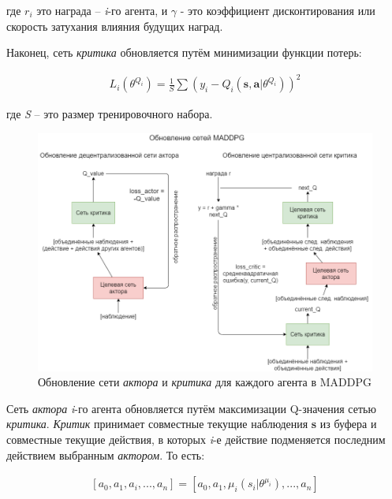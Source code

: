 где $r_i$ это награда – \textit{i}-го агента, и $\gamma$ - это коэффициент дисконтирования или скорость затухания влияния будущих наград.

Наконец, сеть \textit{критика} обновляется путём минимизации функции потерь:

\begin{equation}
    \begin{multlined}
        L_i(\theta^{Q_i}) = \frac{1}{S} \sum (y_i - Q_i(\mathbf{s, a}|\theta^{Q_i}))^2
    \end{multlined}
\end{equation}

где \textit{S} -- это размер тренировочного набора.

\begin{figure}[ht!]
    \center
    \includegraphics [scale=0.5] {my_folder/images/ch3/maddpg-updating-networks.png}
    \caption{Обновление сети \textit{актора} и \textit{критика} для каждого агента в MADDPG}
    \label{fig:ch3-network-training}
\end{figure}

Сеть \textit{актора} \textit{i}-го агента обновляется путём максимизации Q-значения сетью \textit{критика}. \textit{Критик} принимает совместные текущие наблюдения \textbf{s} из буфера и совместные текущие действия, в которых \textit{i}-е действие подменяется последним действием выбранным \textit{актором}. То есть:

\begin{equation}
    \begin{multlined}
    [a_0, a_1, a_i, ..., a_n]
        = [a_0, a_1, \mu_i(s_i|\theta^{\mu_i}), ..., a_n]
    \end{multlined}
\end{equation}

